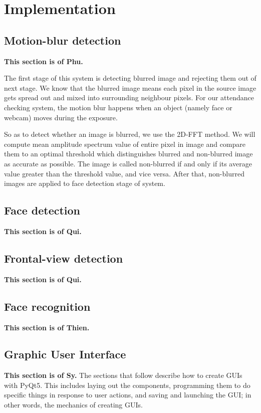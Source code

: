 \documentclass[journal, twocolumn]{IEEEtran}
\begin{document}
\medskip
\section{Implementation}
\label{implementation}

\subsection{Motion-blur detection}
\label{motion-blur-detection}
\textbf{This section is of Phu.}

The first stage of this system is detecting blurred image and rejecting them out of next stage. We know that the blurred image means each pixel in the source image gets spread out and mixed into surrounding neighbour pixels. For our attendance checking system, the motion blur happens when an object (namely face or webcam) moves during the exposure. 

So as to detect whether an image is blurred, we use the 2D-FFT method. We will compute mean amplitude spectrum value of entire pixel in image and compare them to an optimal threshold which distinguishes blurred and non-blurred image as accurate as possible. The image is called non-blurred if and only if its average value greater than the threshold value, and vice versa. After that, non-blurred images are applied to face detection stage of system.

\subsection{Face detection}
\label{face-detection}
\textbf{This section is of Qui.}

\subsection{Frontal-view detection}
\label{frontal-view-detection}
\textbf{This section is of Qui.}

\subsection{Face recognition}
\label{face-recognition}
\textbf{This section is of Thien.}

\subsection{Graphic User Interface}
\label{gui}
\textbf{This section is of Sy.}
The sections that follow describe how to create GUIs with PyQt5. This includes laying out the components, programming them to do specific things in response to user actions, and saving and launching the GUI; in other words, the mechanics of creating GUIs.
\end{document}
